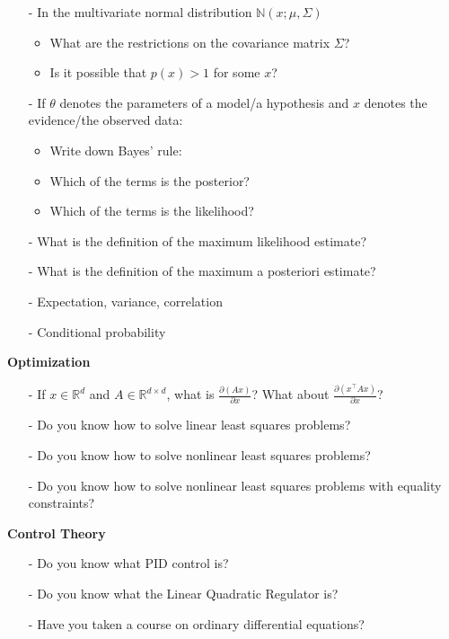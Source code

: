 \documentclass{article}
\begin{document}
\begin{itemize}
\item[-] In the multivariate normal distribution $\mathbb{N}(x; \mu, \Sigma)$
  \begin{itemize}
  \item What are the restrictions on the covariance matrix $\Sigma$?
  \item Is it possible that $p(x) > 1$ for some $x$?
  \end{itemize}

\item[-] If $\theta$ denotes the parameters of a model/a hypothesis and $x$ denotes the evidence/the observed data:
  \begin{itemize}
  \item Write down Bayes' rule:
  \item Which of the terms is the posterior?
  \item Which of the terms is the likelihood?
  \end{itemize}
\item[-] What is the definition of the maximum likelihood estimate?
\item[-] What is the definition of the maximum a posteriori estimate?
\item[-] Expectation, variance, correlation
\item[-] Conditional probability


\end{itemize}
\quad
\newline
\noindent \textbf{Optimization}
\newline
\begin{itemize}
\item[-] If $x \in \mathbb{R}^d$ and $A \in \mathbb{R}^{d \times d}$, what is $\frac{\partial (Ax)}{\partial x}$? What about $\frac{\partial (x^\top Ax)}{\partial x}$?
\item[-] Do you know how to solve linear least squares problems?
\item[-] Do you know how to solve nonlinear least squares problems?
\item[-] Do you know how to solve nonlinear least squares problems with equality constraints?
\end{itemize}
\quad
\newline
\quad
\newline
\noindent \textbf{Control Theory}
\newline
\begin{itemize}
\item[-] Do you know what PID control is?
\item[-] Do you know what the Linear Quadratic Regulator is?
\item[-] Have you taken a course on ordinary differential equations?
\end{itemize}
\quad
\newline
\newline
\quad
\newline
\end{document}
